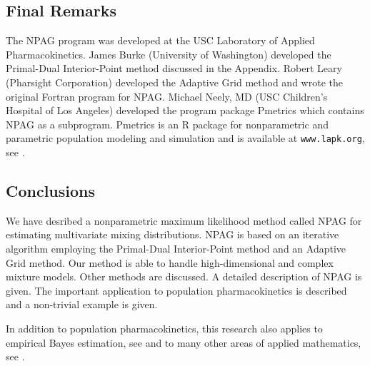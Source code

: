 
\subsection{Final Remarks}
The NPAG program was developed at the USC Laboratory of Applied Pharmacokinetics. James Burke (University of Washington) developed the Primal-Dual Interior-Point  method discussed in the Appendix.
%
Robert Leary (Pharsight Corporation) developed the Adaptive Grid method and  wrote the original Fortran program for NPAG. 
%
Michael Neely, MD (USC Children's Hospital of Los Angeles) developed the program package Pmetrics which contains NPAG as a subprogram. Pmetrics  is an R package for nonparametric and parametric population modeling and simulation and is available at  {\tt www.lapk.org}, see \citet{Neely2011PMetrics}.
%
\subsection{Conclusions}
We have desribed a nonparametric maximum likelihood method called NPAG for estimating multivariate mixing distributions. NPAG is based on an iterative algorithm employing
the Primal-Dual Interior-Point method and an Adaptive Grid method.
Our method is able to handle high-dimensional and complex mixture models.  Other methods are discussed. A detailed description of NPAG is given. The important application to population pharmacokinetics is described and a non-trivial example is given. 

In addition to population pharmacokinetics, this research also applies to empirical Bayes estimation, see
\citet{KoenkerMizera14} and to many other areas of applied mathematics, see \citet{Banks12}.





	